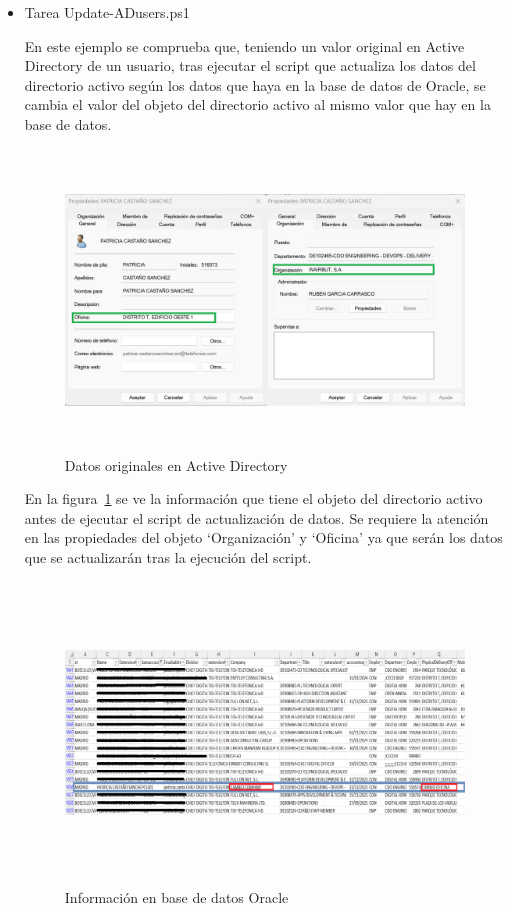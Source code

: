 \documentclass[a4paper, 12pt]{book}
\begin{document}
\begin{itemize}

\item Tarea Update-ADusers.ps1

En este ejemplo se comprueba que, teniendo un valor original en Active Directory de un usuario, tras ejecutar el script que actualiza los datos del directorio activo según los datos que haya en la base de datos de Oracle, se cambia el valor del objeto del directorio activo al mismo valor que hay en la base de datos.

\begin{figure}[h]
	\centering
	\includegraphics[width=15cm, height=8cm, keepaspectratio]{img/image01.png}
	\caption{Datos originales en Active Directory}
	\label{fig:image01}
\end{figure}

En la figura~\ref{fig:image01} se ve la información que tiene el objeto del directorio activo antes de ejecutar el script de actualización de datos. Se requiere la atención en las propiedades del objeto ‘Organización’ y ‘Oficina’ ya que serán los datos que se actualizarán tras la ejecución del script.

\begin{figure}[h]
	\centering
	\includegraphics[width=15cm, height=8cm, keepaspectratio]{img/image02.png}
	\caption{Información en base de datos Oracle}
	\label{fig:image02}
\end{figure}


\end{itemize}
\end{document}
